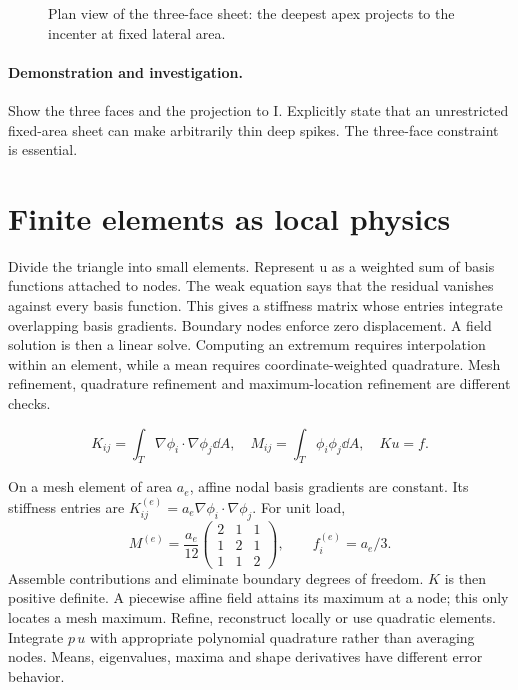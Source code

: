 \documentclass[11pt,oneside,openany]{book}
\begin{document}
\begin{figure}[htbp]\centering
{}
\caption[Plan view of the three-face sheet: the deepest apex projects to the incenter at fixed lateral area]{Plan view of the three-face sheet: the deepest apex projects to the incenter at fixed lateral area.}\label{fig:sheet}
\end{figure}

\paragraph{Demonstration and investigation.} Show the three faces and the projection to I. Explicitly state that an unrestricted fixed-area sheet can make arbitrarily thin deep spikes. The three-face constraint is essential.


\section{Finite elements as local physics}\label{sec:slide43}

Divide the triangle into small elements. Represent u as a weighted sum of basis functions attached to nodes. The weak equation says that the residual vanishes against every basis function. This gives a stiffness matrix whose entries integrate overlapping basis gradients. Boundary nodes enforce zero displacement. A field solution is then a linear solve. Computing an extremum requires interpolation within an element, while a mean requires coordinate-weighted quadrature. Mesh refinement, quadrature refinement and maximum-location refinement are different checks.


\[K_{ij}=\int_T\nabla\phi_i\cdot\nabla\phi_j\dd A,\quad M_{ij}=\int_T\phi_i\phi_j\dd A,\quad Ku=f.\]



On a mesh element of area $a_e$, affine nodal basis gradients are
constant. Its stiffness entries are
$K_{ij}^{(e)}=a_e\nabla\phi_i\cdot\nabla\phi_j$.
For unit load,
\[
M^{(e)}=\frac{a_e}{12}
\begin{pmatrix}2&1&1\\1&2&1\\1&1&2\end{pmatrix},
\qquad f_i^{(e)}=a_e/3.
\]
Assemble contributions and eliminate boundary degrees of freedom.
$K$ is then positive definite. A piecewise affine field attains its
maximum at a node; this only locates a mesh maximum.
Refine, reconstruct locally or use quadratic elements.
Integrate $p\,u$ with appropriate polynomial quadrature rather than
averaging nodes. Means, eigenvalues, maxima and shape derivatives
have different error behavior.
\end{document}
